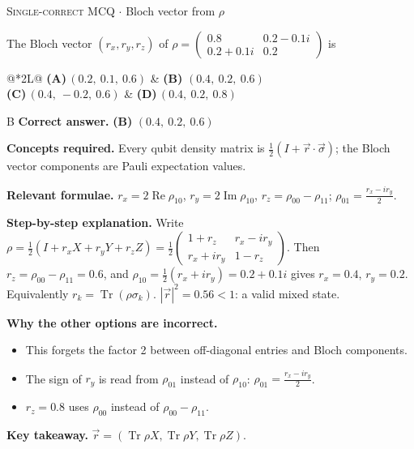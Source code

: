 \documentclass[11pt,a4paper]{article}
\newcommand{\optlabel}[1]{\textbf{(#1)}}
\newcommand{\correctlabel}[1]{\textcolor{okgreen}{\textbf{(#1)}\,\ding{51}}}
\newenvironment{qitem}[1]{\begin{list}{}{\setlength{\leftmargin}{3.3em}\setlength{\labelwidth}{3.1em}%
  \setlength{\labelsep}{0.2em}\setlength{\topsep}{3pt}\setlength{\parsep}{3pt}}\item[\textbf{Q.#1}\hfill]}{\end{list}}
\newcommand{\qsep}{\par\vspace{2pt}{\color{black!15}\hrule}\vspace{4pt}}
\newcommand{\qmeta}[2]{{\footnotesize\color{black!60}\textsc{#1} \;$\cdot$\; #2}\par}
\begin{document}
\begin{qitem}{3}
\qmeta{Single-correct MCQ}{Bloch vector from $\rho$}
The Bloch vector $(r_x, r_y, r_z)$ of $\rho = \begin{pmatrix}0.8 & 0.2 - 0.1i\\ 0.2 + 0.1i & 0.2\end{pmatrix}$ is
\par\smallskip\noindent\begin{tabularx}{\linewidth}{@{}*{2}{L}@{}}
\optlabel{A}\,$(0.2,\ 0.1,\ 0.6)$ & \correctlabel{B}\,$(0.4,\ 0.2,\ 0.6)$ \\[3pt]
\optlabel{C}\,$(0.4,\ -0.2,\ 0.6)$ & \optlabel{D}\,$(0.4,\ 0.2,\ 0.8)$
\end{tabularx}
\end{qitem}
\begin{solbox}{B}
\textbf{\color{brand}Correct answer.} \textcolor{okgreen}{\textbf{(B)}} $(0.4,\ 0.2,\ 0.6)$

\textbf{\color{brand}Concepts required.} Every qubit density matrix is $\frac12(I + \vec r\cdot\vec\sigma)$; the Bloch vector components are Pauli expectation values.

\textbf{\color{brand}Relevant formulae.} $r_x = 2\operatorname{Re}\rho_{10}$, $r_y = 2\operatorname{Im}\rho_{10}$, $r_z = \rho_{00} - \rho_{11}$; $\rho_{01} = \frac{r_x - ir_y}{2}$.

\textbf{\color{brand}Step-by-step explanation.} Write $\rho = \frac12(I + r_xX + r_yY + r_zZ) = \frac12\begin{pmatrix}1 + r_z & r_x - ir_y\\ r_x + ir_y & 1 - r_z\end{pmatrix}$.
Then $r_z = \rho_{00} - \rho_{11} = 0.6$, and $\rho_{10} = \frac12(r_x + ir_y) = 0.2 + 0.1i$ gives $r_x = 0.4$, $r_y = 0.2$.
Equivalently $r_k = \operatorname{Tr}(\rho\sigma_k)$. $|\vec r|^2 = 0.56 < 1$: a valid mixed state.

\textbf{\color{brand}Why the other options are incorrect.}
\begin{itemize}[leftmargin=2.4em, itemsep=1pt, topsep=2pt]
\item[\textbf{(A)}] This forgets the factor 2 between off-diagonal entries and Bloch components.
\item[\textbf{(C)}] The sign of $r_y$ is read from $\rho_{01}$ instead of $\rho_{10}$: $\rho_{01} = \frac{r_x - ir_y}{2}$.
\item[\textbf{(D)}] $r_z = 0.8$ uses $\rho_{00}$ instead of $\rho_{00} - \rho_{11}$.
\end{itemize}
\textbf{\color{brand}Key takeaway.} $\vec r = (\operatorname{Tr}\rho X, \operatorname{Tr}\rho Y, \operatorname{Tr}\rho Z)$.
\end{solbox}
\qsep
\end{document}

